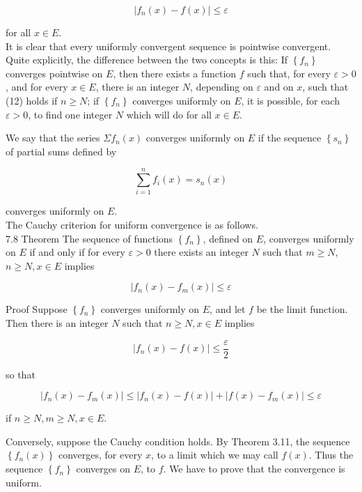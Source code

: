 \documentclass[10pt]{article}
\begin{document}
\begin{equation*}
\left|f_{n}(x)-f(x)\right| \leq \varepsilon \tag{12}
\end{equation*}


for all $x \in E$.\\
It is clear that every uniformly convergent sequence is pointwise convergent. Quite explicitly, the difference between the two concepts is this: If $\left\{f_{n}\right\}$ converges pointwise on $E$, then there exists a function $f$ such that, for every $\varepsilon>0$, and for every $x \in E$, there is an integer $N$, depending on $\varepsilon$ and on $x$, such that (12) holds if $n \geq N$; if $\left\{f_{n}\right\}$ converges uniformly on $E$, it is possible, for each $\varepsilon>0$, to find one integer $N$ which will do for all $x \in E$.

We say that the series $\Sigma f_{n}(x)$ converges uniformly on $E$ if the sequence $\left\{s_{n}\right\}$ of partial sums defined by

$$
\sum_{i=1}^{n} f_{i}(x)=s_{n}(x)
$$

converges uniformly on $E$.\\
The Cauchy criterion for uniform convergence is as follows.\\
7.8 Theorem The sequence of functions $\left\{f_{n}\right\}$, defined on $E$, converges uniformly on $E$ if and only if for every $\varepsilon>0$ there exists an integer $N$ such that $m \geq N$, $n \geq N, x \in E$ implies


\begin{equation*}
\left|f_{n}(x)-f_{m}(x)\right| \leq \varepsilon \tag{13}
\end{equation*}


Proof Suppose $\left\{f_{n}\right\}$ converges uniformly on $E$, and let $f$ be the limit function. Then there is an integer $N$ such that $n \geq N, x \in E$ implies

$$
\left|f_{n}(x)-f(x)\right| \leq \frac{\varepsilon}{2}
$$

so that

$$
\left|f_{n}(x)-f_{m}(x)\right| \leq\left|f_{n}(x)-f(x)\right|+\left|f(x)-f_{m}(x)\right| \leq \varepsilon
$$

if $n \geq N, m \geq N, x \in E$.

Conversely, suppose the Cauchy condition holds. By Theorem 3.11, the sequence $\left\{f_{n}(x)\right\}$ converges, for every $x$, to a limit which we may call $f(x)$. Thus the sequence $\left\{f_{n}\right\}$ converges on $E$, to $f$. We have to prove that the convergence is uniform.
\end{document}
